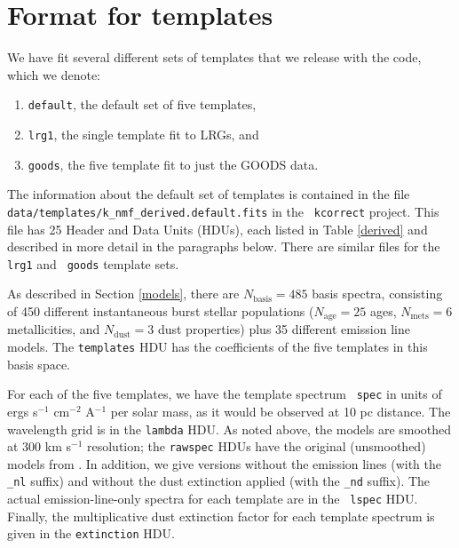 \documentclass[12pt,preprint]{aastex}
\newcommand{\T}{^{\scriptscriptstyle \top}}
\newcommand{\XXt}{\tilde{X}}
\newcommand{\Xkn}{X_{kn}}
\renewcommand{\AA}{A}
\newcommand{\AAt}{\tilde{A}}
\newcommand{\BB}{B}
\newcommand{\MM}{M}
\newcommand{\MMt}{\tilde{M}}
\newcommand{\Aki}{A_{ki}}
\newcommand{\Bij}{B_{ij}}
\newcommand{\Mjn}{M_{jn}}
\newcommand{\skn}{\sigma_{kn}}
\begin{document}


\section{Format for templates}
\label{format}

We have fit several different sets of templates that we release
with the code, which we denote:
\begin{enumerate}
\item {\tt default}, the default set of five templates, 
\item {\tt lrg1}, the single template fit to LRGs, and 
\item {\tt goods}, the five template fit to just the GOODS data.
\end{enumerate}
The information about the default set of templates is contained in the
file {\tt data/templates/k\_nmf\_derived.default.fits} in the {\tt
kcorrect} project.  This file has 25 Header and Data Units (HDUs),
each listed in Table \ref{derived} and described in more detail in the
paragraphs below.  There are similar files for the {\tt lrg1} and {\tt
goods} template sets.

As described in Section \ref{models}, there are $N_{\mathrm{basis}} =
485$ basis spectra, consisting of 450 different instantaneous burst
stellar populations ($N_{\mathrm{age}} = 25$ ages, $N_{\mathrm{mets}}
= 6$ metallicities, and $N_{\mathrm{dust}}=3$ dust properties) plus 35
different emission line models. The {\tt templates} HDU has the
coefficients of the five templates in this basis space. 

For each of the five templates, we have the template spectrum {\tt
spec} in units of ergs s$^{-1}$ cm$^{-2}$ \AA$^{-1}$ per solar mass,
as it would be observed at 10 pc distance. The wavelength grid is in
the {\tt lambda} HDU. As noted above, the models are smoothed at 300
km s$^{-1}$ resolution; the {\tt rawspec} HDUs have the original
(unsmoothed) models from \citet{bruzual03a}. In addition, we give
versions without the emission lines (with the {\tt \_nl} suffix) and
without the dust extinction applied (with the {\tt \_nd} suffix). The
actual emission-line-only spectra for each template are in the {\tt
lspec} HDU. Finally, the multiplicative dust extinction factor for
each template spectrum is given in the {\tt extinction} HDU.
\end{document}
